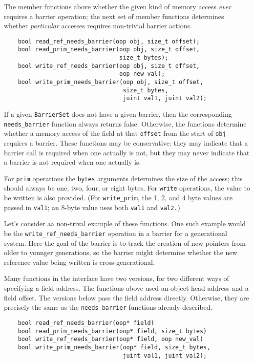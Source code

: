 \documentclass{article}
\begin{document}
The member functions above whether the given kind of memory access {\em ever}
requires a barrier operation; the next set of member functions
determines whether {\em particular} accesses requires non-trivial
barrier actions.
\begin{verbatim}
    bool read_ref_needs_barrier(oop obj, size_t offset);
    bool read_prim_needs_barrier(oop obj, size_t offset,
                                 size_t bytes);
    bool write_ref_needs_barrier(oop obj, size_t offset,
                                 oop new_val);
    bool write_prim_needs_barrier(oop obj, size_t offset,
                                  size_t bytes,
                                  juint val1, juint val2);
\end{verbatim}
If a given {\tt BarrierSet} does not have a given barrier, then the
corresponding {\tt needs\_barrier} function always returns false.
Otherwise, the functions determine whether a memory access of the
field at that {\tt offset} from the start of {\tt obj} requires a
barrier.  These functions may be conservative: they may indicate that
a barrier call is required when one actually is not, but they may
never indicate that a barrier is not required when one actually is.

For {\tt prim} operations the {\tt bytes} arguments
determines the size of the access; this should always be one, two,
four, or eight bytes.  For {\tt write} operations, the value to be
written is also provided.  (For {\tt write\_prim}, the 1, 2, and 4 byte
values are passed in {\tt val1}; an 8-byte value uses both {\tt val1}
and {\tt val2.})

Let's consider aa non-trival example of these functions.  One such
example would be the {\tt write\_ref\_needs\_barrier} operation in a
barrier for a generational system.  Here the goal of the barrier is to
track the creation of new pointers from older to younger generations,
so the barrier might determine whether the new reference value being
written is cross-generational.

Many functions in the interface have two versions, for two different
ways of specifying a field address.  The functions above used an
object head address and a field offset.  The versions below pass the
field address directly.  Otherwise, they are precisely the same as the
{\tt needs\_barrier} functions already described.
\begin{verbatim}
    bool read_ref_needs_barrier(oop* field)
    bool read_prim_needs_barrier(oop* field, size_t bytes)
    bool write_ref_needs_barrier(oop* field, oop new_val)
    bool write_prim_needs_barrier(oop* field, size_t bytes,
                                  juint val1, juint val2);
\end{verbatim}
\end{document}
